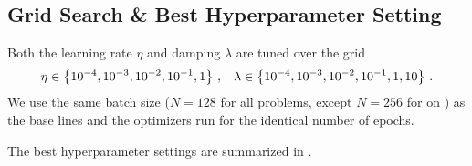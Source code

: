 \subsection{Grid Search \& Best Hyperparameter
  Setting}\label{backpack::app:grid-search}

Both the learning rate $\eta$ and damping $\lambda$ are tuned over the grid
\begin{align*}
  \eta \in \left\{10^{-4}, 10^{-3}, 10^{-2}, 10^{-1}, 1 \right\}\,{,} \quad \lambda \in \left\{10^{-4}, 10^{-3}, 10^{-2}, 10^{-1}, 1, 10 \right\}\,{.}
\end{align*}
We use the same batch size ($N=128$ for all problems, except $N=256$ for
\ALLCNNC on ) as the base lines and the optimizers run for the
identical number of epochs.

The best hyperparameter settings are summarized in
.


